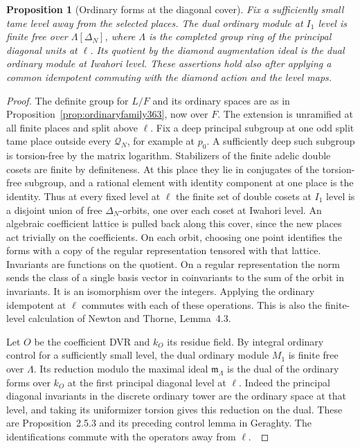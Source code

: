 \documentclass[a4paper,11pt]{article}
\newtheorem{proposition}{Proposition}[section]
\theoremstyle{definition}
\theoremstyle{remark}
\numberwithin{equation}{section}
\begin{document}
\begin{proposition}[Ordinary forms at the diagonal cover]
\label{prop:diamond370}
Fix a sufficiently small tame level away from the selected
places. The dual ordinary module at \(I_1\) level is finite
free over \(\Lambda[\Delta_N]\), where \(\Lambda\) is the
completed group ring of the principal diagonal units at
\(\ell\). Its quotient by the diamond augmentation ideal
is the dual ordinary module at Iwahori level. These assertions
hold also after applying a common idempotent commuting with
the diamond action and the level maps.
\end{proposition}
\begin{proof}
The definite group for \(L/F\) and its ordinary spaces are
as in Proposition~\ref{prop:ordinaryfamily363}, now over \(F\).
The extension is unramified at all finite places and split
above \(\ell\). Fix a deep principal subgroup at one odd
split tame place outside every \(\mathcal Q_N\), for example
at \(p_0\). A sufficiently deep such subgroup is torsion-free
by the matrix logarithm. Stabilizers of the finite adelic
double cosets are finite by definiteness. At this place they
lie in conjugates of the torsion-free subgroup, and a rational
element with identity component at one place is the identity.
Thus at every fixed level at \(\ell\) the
finite set of double cosets at \(I_1\) level is a disjoint
union of free \(\Delta_N\)-orbits, one over each coset at
Iwahori level. An algebraic coefficient lattice is pulled
back along this cover, since the new places act trivially on
the coefficients. On each orbit, choosing one point identifies
the forms with a copy of the regular representation tensored
with that lattice. Invariants are functions on the quotient.
On a regular representation the norm sends the class of a
single basis vector in coinvariants to the sum of the orbit
in invariants. It is an isomorphism over the integers.
Applying the ordinary idempotent at \(\ell\) commutes with
each of these operations. This is also the finite-level
calculation of Newton and Thorne, Lemma~4.3.~\cite{VII-V-VI-nt119}

Let \(O\) be the coefficient DVR and \(k_O\) its residue
field. By integral ordinary control for a sufficiently small
level, the dual ordinary module \(M_1\) is finite free over
\(\Lambda\). Its reduction modulo the maximal ideal
\(\mathfrak m_\Lambda\) is the dual of the ordinary forms over
\(k_O\) at the first principal diagonal level at \(\ell\).
Indeed the principal diagonal invariants in the discrete
ordinary tower are the ordinary space at that level, and
taking its uniformizer torsion gives this reduction on the
dual. These are Proposition~2.5.3 and its preceding control
lemma in Geraghty. The identifications commute with the
operators away from \(\ell\).~\cite{VII-V-geraghty363}


\end{proof}
\end{document}

